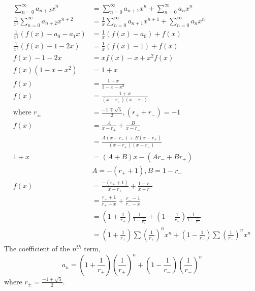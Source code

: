     \begin{align*}
        \sum_{n=0}^{\infty}{a_{n+2}x^n} 
        & = \sum_{n=0}^{\infty}{a_{n+1}x^n} 
        + \sum_{n=0}^{\infty}{a_nx^n}\\
        \frac{1}{x^2}\sum_{n=0}^{\infty}{a_{n+2}x^{n+2}} 
        & = \frac{1}{x}\sum_{n=0}^{\infty}{a_{n+1}x^{n+1}} 
        + \sum_{n=0}^{\infty}{a_{n}x^{n}}\\
        \frac{1}{x^2}(f(x)-a_0-a_1x) 
        & = \frac{1}{x}(f(x)-a_0)
        + f(x)\\
        \frac{1}{x^2}(f(x)-1-2x) 
        & = \frac{1}{x}(f(x)-1)
        + f(x)\\
        f(x)-1-2x
        & = xf(x)-x + x^2f(x)\\
        f(x)(1-x-x^2) & = 1+x\\
        f(x) & = \frac{1+x}{1-x-x^2}\\
        f(x) & = \frac{1+x}{(x-r_+)(x-r_-)}\\
        \text{where }r_{\pm} & = \frac{-1\mp\sqrt{5}}{2}, 
        (r_++r_-)=-1\\
        f(x) & = \frac{A}{x-r_+} + \frac{B}{x-r_-}\\
        & = \frac{A(x-r_-)+B(x-r_+)}{(x-r_+)(x-r_-)}\\
        1+x& = (A+B)x-(Ar_-+Br_+)\\
        & A=-(r_++1), B=1-r_-\\
        f(x) & = \frac{-(r_++1)}{x-r_+} + \frac{1-r_-}{x-r_-}\\
        & = \frac{r_++1}{r_+-x} + \frac{r_--1}{r_--x}\\
        & = (1+\frac{1}{r_+}) \frac{1}{1-\frac{x}{r_+}}
        + (1-\frac{1}{r_-}) \frac{1}{1-\frac{x}{r_-}}\\
        & = (1+\frac{1}{r_+}) \sum{(\frac{1}{r_+})^nx^n}
        + (1-\frac{1}{r_-}) \sum{(\frac{1}{r_-})^nx^n}
    \end{align*}
    The coefficient of the $n^{th}$ term,
    \begin{equation*}
        \boxed{
            a_n = (1+\frac{1}{r_+}) (\frac{1}{r_+})^n
            + (1-\frac{1}{r_-}) (\frac{1}{r_-})^n
        }
    \end{equation*} where $r_{\pm} = \frac{-1\mp\sqrt{5}}{2}$.